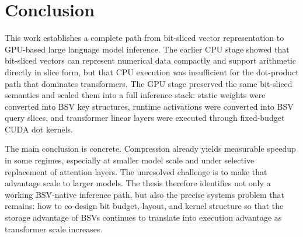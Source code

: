\section{Conclusion}\label{sec:conclusion}
This work establishes a complete path from bit-sliced vector representation to GPU-based large language model inference. The earlier CPU stage showed that bit-sliced vectors can represent numerical data compactly and support arithmetic directly in slice form, but that CPU execution was insufficient for the dot-product path that dominates transformers. The GPU stage preserved the same bit-sliced semantics and scaled them into a full inference stack: static weights were converted into BSV key structures, runtime activations were converted into BSV query slices, and transformer linear layers were executed through fixed-budget CUDA dot kernels.

The main conclusion is concrete. Compression already yields measurable speedup in some regimes, especially at smaller model scale and under selective replacement of attention layers. The unresolved challenge is to make that advantage scale to larger models. The thesis therefore identifies not only a working BSV-native inference path, but also the precise systems problem that remains: how to co-design bit budget, layout, and kernel structure so that the storage advantage of BSVs continues to translate into execution advantage as transformer scale increases.
